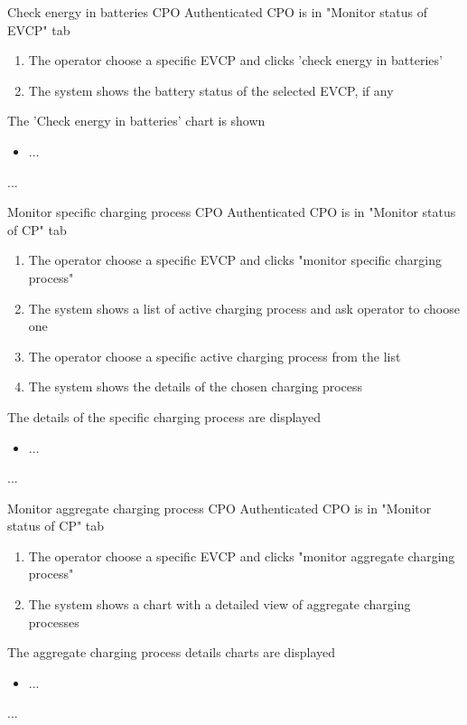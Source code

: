\usecase
{Check energy in batteries} %
{CPO} %
{Authenticated CPO is in "Monitor status of EVCP" tab} %
{ %
    \begin{enumerate}
        \item The operator choose a specific EVCP and clicks 'check energy in batteries'
        \item The system shows the battery status of the selected EVCP, if any
    \end{enumerate}
}
{The 'Check energy in batteries' chart is shown} %
{ %
    \begin{itemize}
        \item ...
    \end{itemize}
}
{ %
    ...
}

\usecase
{Monitor specific charging process} %
{CPO} %
{Authenticated CPO is in "Monitor status of CP" tab} %
{ %
    \begin{enumerate}
        \item The operator choose a specific EVCP and clicks "monitor specific charging process"
        \item The system shows a list of active charging process and ask operator to choose one
        \item The operator choose a specific active charging process from the list
        \item The system shows the details of the chosen charging process
    \end{enumerate}
}
{The details of the specific charging process are displayed} %
{ %
    \begin{itemize}
        \item ...
    \end{itemize}
}
{ %
...
}

\usecase
{Monitor aggregate charging process} %
{CPO} %
{Authenticated CPO is in "Monitor status of CP" tab} %
{ %
    \begin{enumerate}
        \item The operator choose a specific EVCP and clicks "monitor aggregate charging process"
        \item The system shows a chart with a detailed view of aggregate charging processes
    \end{enumerate}
}
{The aggregate charging process details charts are displayed} %
{ %
    \begin{itemize}
        \item ...
    \end{itemize}
}
{ %
...
}

